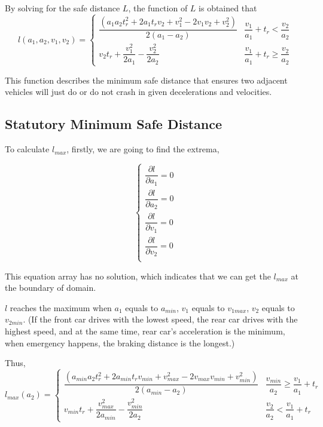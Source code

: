 By solving for the safe distance $ L $, the function of 
$ L $ is obtained that 
\begin{equation}
l(a_1, a_2, v_1, v_2) = 
\left \{
\begin{array}{cl}
\dfrac{(a_1a_2t_r^2 + 2a_1t_rv_2 + v_1^2 - 2v_1v_2 + 
v_2^2)}{2(a_1-a_2)} & 
\dfrac{v_1}{a_1} + t_r < \dfrac{v_2}{a_2}\\
v_2 t_r + \dfrac{v_1 ^ 2}{2a_1} -\dfrac{v_2^2}{2a_2} & 
\dfrac{v_1}{a_1} + t_r \geq \dfrac{v_2}{a_2}
\end{array}
\right .
\end{equation}

This function describes the minimum safe distance that 
ensures two adjacent vehicles will just do or do not 
crash in given decelerations and velocities.


\subsection{Statutory Minimum Safe Distance}

To calculate $l_{max}$, firstly, we are going to find the extrema,

\begin{displaymath}
\left \{
\begin{array}{cl}
\dfrac{\partial l}{\partial{a_1}} = 0 \\
\dfrac{\partial l}{\partial{a_2}} = 0 \\
\dfrac{\partial l}{\partial{v_1}} = 0 \\
\dfrac{\partial l}{\partial{v_2}} = 0 \\
\end{array}
\right .
\end{displaymath}

This equation array has no solution, which indicates that we can 
get the $l_{max}$ at the boundary of domain.

$l$ reaches the maximum when $a_1$ equals to $a_{min}$, { }$v_1$ 
equals to $v_{1max}$, $v_2$ equals to $v_{2min}$. (If the front 
car drives with the lowest speed, the rear car drives with the 
highest speed, and at the same time, rear car's acceleration is 
the minimum, when emergency happens, the braking distance is 
the longest.)

Thus,
\begin{displaymath}
l_{max}(a_2) = 
\left \{
\begin{array}{cl}
\dfrac{(a_{min}a_2t_r^2 + 2a_{min}t_rv_{min} + v_{max}^2 - 2v_{max}v_{min} + v_{min}^2)}{2(a_{min}-a_2)} & \dfrac{v_{min}}{a_2}  \geq \dfrac{v_1}{a_1} + t_r \\
v_{min} t_r + \dfrac{v_{max} ^ 2}{2a_{min}} -\dfrac{v_{min}^2}{2a_2} & \dfrac{v_2}{a_2}  < \dfrac{v_1}{a_1} + t_r
\end{array}
\right .
\end{displaymath}\\

